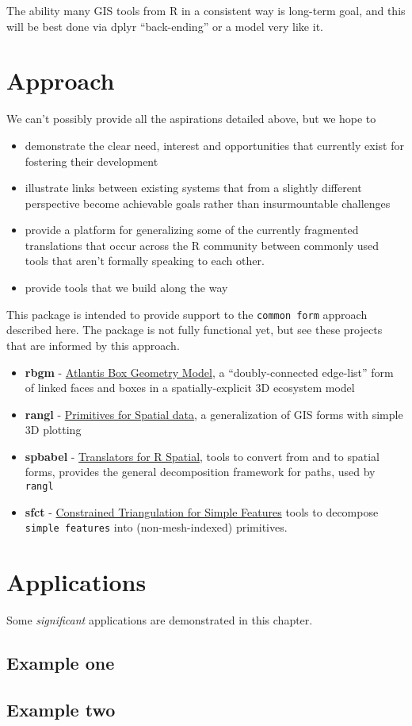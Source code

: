 \documentclass[]{book}
\providecommand{\tightlist}{%
  \setlength{\itemsep}{0pt}\setlength{\parskip}{0pt}}
\theoremstyle{definition}
\theoremstyle{definition}
\theoremstyle{definition}
\theoremstyle{remark}
\begin{document}
The ability many GIS tools from R in a consistent way is long-term goal,
and this will be best done via dplyr ``back-ending'' or a model very
like it.

\chapter{Approach}\label{approach}

We can't possibly provide all the aspirations detailed above, but we
hope to

\begin{itemize}
\tightlist
\item
  demonstrate the clear need, interest and opportunities that currently
  exist for fostering their development
\item
  illustrate links between existing systems that from a slightly
  different perspective become achievable goals rather than
  insurmountable challenges
\item
  provide a platform for generalizing some of the currently fragmented
  translations that occur across the R community between commonly used
  tools that aren't formally speaking to each other.
\item
  provide tools that we build along the way
\end{itemize}

This package is intended to provide support to the \texttt{common\ form}
approach described here. The package is not fully functional yet, but
see these projects that are informed by this approach.

\begin{itemize}
\tightlist
\item
  \textbf{rbgm} -
  \href{https://github.com/AustralianAntarcticDivision/rbgm}{Atlantis
  Box Geometry Model}, a ``doubly-connected edge-list'' form of linked
  faces and boxes in a spatially-explicit 3D ecosystem model
\item
  \textbf{rangl} - \href{https://github.com/r-gris/rangl}{Primitives for
  Spatial data}, a generalization of GIS forms with simple 3D plotting
\item
  \textbf{spbabel} -
  \href{https://github.com/mdsumner/spbabel}{Translators for R Spatial},
  tools to convert from and to spatial forms, provides the general
  decomposition framework for paths, used by \texttt{rangl}
\item
  \textbf{sfct} - \href{https://github.com/r-gris/sfct}{Constrained
  Triangulation for Simple Features} tools to decompose
  \texttt{simple\ features} into (non-mesh-indexed) primitives.
\end{itemize}

\chapter{Applications}\label{applications}

Some \emph{significant} applications are demonstrated in this chapter.

\section{Example one}\label{example-one}

\section{Example two}\label{example-two}


\end{document}
